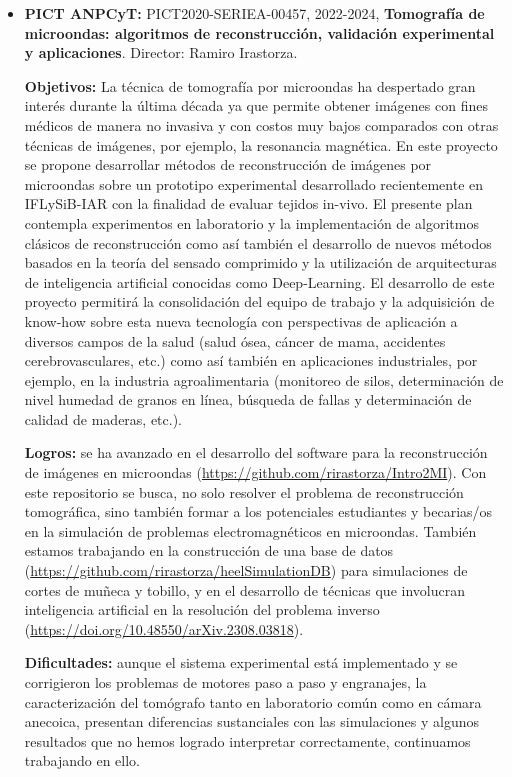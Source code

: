 \documentclass[a4paper,11pt,twoside,final,titlepage,onecolumn,openright]{report}
\begin{document}
\begin{itemize}
 {\bf Dificultades:} no se produjeron dificultades en el desarrollo del proyecto. 

\item \textbf{PICT ANPCyT:} PICT2020-SERIEA-00457, 2022-2024, {\bf Tomografía de microondas: algoritmos de reconstrucción, validación experimental y aplicaciones}. Director: Ramiro Irastorza.

    \textbf{Objetivos:} La técnica de tomografía por microondas ha despertado gran interés durante la última década ya que permite obtener imágenes con fines médicos de manera no invasiva y con costos muy bajos comparados con otras técnicas de imágenes, por ejemplo, la resonancia magnética. En este proyecto se propone desarrollar métodos de reconstrucción de imágenes por microondas sobre un prototipo experimental desarrollado recientemente en IFLySiB-IAR con la finalidad de evaluar tejidos in-vivo. El presente plan contempla experimentos en laboratorio y la implementación de algoritmos clásicos de reconstrucción como así también el desarrollo de nuevos métodos basados en la teoría del sensado comprimido y la utilización de arquitecturas de inteligencia artificial conocidas como Deep-Learning. El desarrollo de este proyecto permitirá la consolidación del equipo de trabajo y la adquisición de know-how sobre esta nueva tecnología con perspectivas de aplicación a diversos campos de la salud (salud ósea, cáncer de mama, accidentes cerebrovasculares, etc.) como así también en aplicaciones industriales, por ejemplo, en la industria agroalimentaria (monitoreo de silos, determinación de nivel humedad de granos en línea, búsqueda de fallas y determinación de calidad de maderas, etc.).

    \textbf{Logros:}  se ha avanzado en el desarrollo del software para la reconstrucción de imágenes en microondas (\url{https://github.com/rirastorza/Intro2MI}). Con este repositorio se busca, no solo resolver el problema de reconstrucción tomográfica, sino también formar a los potenciales estudiantes y becarias/os en la simulación de problemas electromagnéticos en microondas. También estamos trabajando en la construcción de una base de datos (\url{https://github.com/rirastorza/heelSimulationDB}) para simulaciones de cortes de muñeca y tobillo, y en el desarrollo de técnicas que involucran inteligencia artificial en la resolución del problema inverso (\url{https://doi.org/10.48550/arXiv.2308.03818}). 

\textbf{Dificultades:} aunque el sistema experimental está implementado y se corrigieron los problemas de motores paso a paso y engranajes, la caracterización del tomógrafo tanto en laboratorio común como en cámara anecoica, presentan diferencias sustanciales con las simulaciones y algunos resultados que no hemos logrado interpretar correctamente, continuamos trabajando en ello. 


\end{itemize}
\end{document}
